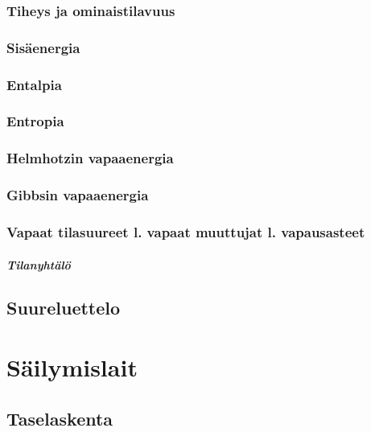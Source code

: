 \documentclass[12pt,a4paper,finnish]{book}
\begin{document}
\subsection{Tiheys ja ominaistilavuus}

\subsection{Sisäenergia}

\subsection{Entalpia}

\subsection{Entropia}

\subsection{Helmhotzin vapaaenergia}

\subsection{Gibbsin vapaaenergia}

\subsection{Vapaat tilasuureet l. vapaat muuttujat l. vapausasteet}

\paragraph{Tilanyhtälö}

\section{Suureluettelo}

\chapter{Säilymislait} %

\section{Taselaskenta}
\end{document}
